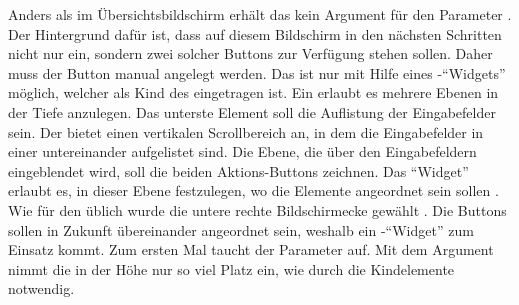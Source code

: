 Anders als im Übersichtsbildschirm erhält das  kein Argument für den Parameter .
Der Hintergrund dafür ist, dass auf diesem Bildschirm in den nächsten Schritten nicht nur ein, sondern zwei solcher Buttons zur Verfügung stehen sollen.
 Daher muss der Button manual angelegt werden.
Das ist nur mit Hilfe eines -\enquote{Widgets} möglich, welcher als Kind des  eingetragen ist.
Ein  erlaubt es mehrere Ebenen in der Tiefe anzulegen.
Das unterste Element soll die Auflistung der Eingabefelder sein.
Der   bietet einen vertikalen Scrollbereich an, in dem die Eingabefelder in einer   untereinander aufgelistet sind.
Die Ebene, die  über den Eingabefeldern eingeblendet wird, soll die beiden Aktions-Buttons zeichnen.
Das \enquote{Widget}  erlaubt es, in dieser Ebene festzulegen, wo die Elemente angeordnet sein sollen .
Wie für den  üblich wurde die untere rechte Bildschirmecke gewählt .
Die Buttons sollen in Zukunft übereinander angeordnet sein, weshalb ein -\enquote{Widget} zum Einsatz kommt.
Zum ersten Mal taucht der Parameter  auf.
Mit dem Argument  nimmt die  in der Höhe nur so viel Platz ein,
wie durch die Kindelemente notwendig.


